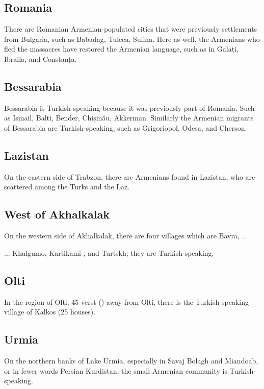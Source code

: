 \subsection{Romania}
There are Romanian Armenian-populated cities that were previously settlements from Bulgaria, such as Babadag, Tulcea, Sulina. Here as well, the Armenians who fled the massacres have restored the Armenian language, such as in Galați, Ibraila, and Constanța. 

\subsection{Bessarabia}

Bessarabia is Turkish-speaking because it was previously part of Romania. Such as Ismail, Balti, Bender, Chișinău, Akkerman. Similarly the Armenian migrants of Bessarabia are Turkish-speaking, such as Grigoriopol, Odesa, and Cherson.

\subsection{Lazistan}
On the eastern side of Trabzon, there are Armenians found in Lazistan, who are scattered among the Turks and the Laz.

\subsection{West of Akhalkalak}

On the western side of Akhalkalak, there are four villages which are Bavra, ... 



\begin{adjarianpage}\label{page:32}\end{adjarianpage}%

... Khulgumo, Kartikami , and Turtskh; they are Turkish-speaking.

\subsection{Olti}
In the region of Olti, 45 verst () away from Olti, there is the Turkish-speaking village of Kalkos (25 houses).

\subsection{Urmia}
On the northern banks of Lake Urmia, especially in Savaj Bolagh and Miandoab, or in fewer words Persian Kurdistan, the small Armenian community is Turkish-speaking. 

